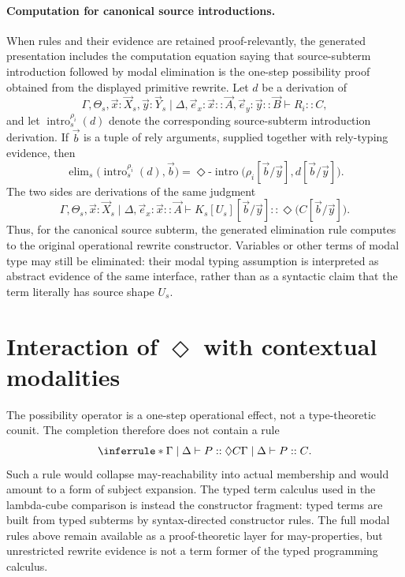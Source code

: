 \documentclass[11pt]{article}
\newcommand{\ty}{\mathrel{::}}
\newcommand{\Dia}{\Diamond}
\begin{document}
\paragraph{Computation for canonical source introductions.}
When rules and their evidence are retained proof-relevantly, the generated
presentation includes the computation equation saying that source-subterm
introduction followed by modal elimination is the one-step possibility proof
obtained from the displayed primitive rewrite.  Let \(d\) be a
derivation of
\[
  \Gamma,\Theta_s,\vec{x}:\vec X_s,\vec{y}:\vec Y_s
  \mid
  \Delta,\vec e_x:\vec{x}\ty\vec{A},\vec e_y:\vec{y}\ty\vec{B}
  \vdash R_i\ty C,
\]
and let \(\operatorname{intro}^{\rho_i}_s(d)\) denote the corresponding
source-subterm introduction derivation.  If \(\vec b\) is a tuple of rely
arguments, supplied together with rely-typing evidence, then
\[
  \operatorname{elim}_s
  \bigl(\operatorname{intro}^{\rho_i}_s(d),\vec b\bigr)
  =
  \Dia\text{-}\operatorname{intro}
  \bigl(\rho_i[\vec b/\vec y],d[\vec b/\vec y]\bigr).
\]
The two sides are derivations of the same judgment
\[
  \Gamma,\Theta_s,\vec{x}:\vec X_s
  \mid
  \Delta,\vec e_x:\vec{x}\ty\vec{A}
  \vdash
  K_s[U_s][\vec b/\vec y]
  \ty
  \Dia\bigl(C[\vec b/\vec y]\bigr).
\]
Thus, for the canonical source subterm, the generated elimination rule computes
to the original operational rewrite constructor.  Variables or other terms of
modal type may still be eliminated: their modal typing assumption is interpreted
as abstract evidence of the same interface, rather than as a syntactic claim that
the term literally has source shape \(U_s\).

\section{Interaction of \texorpdfstring{\(\Dia\)}{Diamond} with contextual modalities}
\label{sec:diamond-modal-interaction}

The possibility operator is a one-step operational effect, not a type-theoretic
counit.  The completion therefore does not contain a rule
\[
  \inferrule*{\Gamma\mid\Delta\vdash P\ty\Dia C}{\Gamma\mid\Delta\vdash P\ty C}.
\]
Such a rule would collapse may-reachability into actual membership and would
amount to a form of subject expansion.  The typed term calculus used in the
lambda-cube comparison is instead the constructor fragment: typed terms are
built from typed subterms by syntax-directed constructor rules.  The full modal
rules above remain available as a proof-theoretic layer for may-properties, but
unrestricted rewrite evidence is not a term former of the typed programming
calculus.
\end{document}
